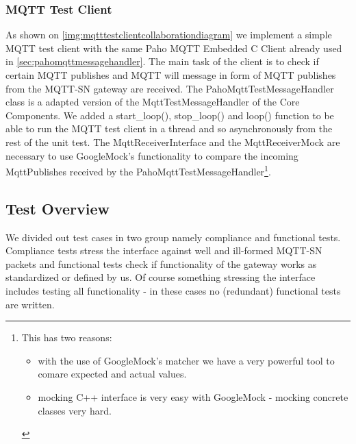 \subsubsection{MQTT Test Client}
As shown on \autoref{img:mqtttestclientcollaborationdiagram} we implement a simple MQTT test client with the same Paho MQTT Embedded C Client already used in \autoref{sec:pahomqttmessagehandler}. 
The main task of the client is to check if certain MQTT publishes and MQTT will message in form of MQTT publishes from the MQTT-SN gateway are received.
The PahoMqttTestMessageHandler class is a adapted version of the MqttTestMessageHandler of the Core Components.
We added a start\_loop(), stop\_loop() and loop() function to be able to run the MQTT test client in a thread and so asynchronously from the rest of the unit test.
The MqttReceiverInterface and the MqttReceiverMock are necessary to use GoogleMock's functionality to compare the incoming MqttPublishes received by the PahoMqttTestMessageHandler\footnote{This has two reasons:
	\begin{itemize}
		\item with the use of GoogleMock's matcher we have a very powerful tool to comare expected and actual values.
		\item mocking C++ interface is very easy with GoogleMock - mocking concrete classes very hard.
	\end{itemize}
}.
\subsection{Test Overview}
We divided out test cases in two group namely compliance and functional tests.
Compliance tests stress the interface against well and ill-formed MQTT-SN packets and functional tests check if functionality of the gateway works as standardized or defined by us.
Of course something stressing the interface includes testing all functionality - in these cases no (redundant) functional tests are written.
